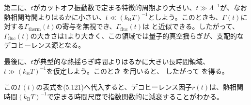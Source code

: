 第二に、$t$がカットオフ振動数で定まる特徴的周期より大きい、$t\gg\Lambda^{-1}$が、なお熱相関時間よりはるかに小さい、$t\ll(k_{\mathrm B}T)^{-1}$としよう。このときも、$\Gamma(t)$に対する$\Gamma_{\mathrm{therm}}(t)$の寄与を無視でき、$\Gamma_{\mathrm{fluc}}(t)$は
と近似できる。したがって、$\Gamma_{\mathrm{fluc}}(t)$の大きさは1より大きく、この領域では量子的真空揺らぎが、支配的なデコヒーレンス源となる。

最後に、$t$が典型的な熱揺らぎ時間よりはるかに大きい長時間領域、$t\gg(k_{\mathrm B}T)^{-1}$を仮定しよう。このとき
を用いると、
したがって
を得る。

\hypertarget{srcpage:218}{}\label{srcpage:218}
この$\Gamma(t)$の表式を(5.121)へ代入すると、デコヒーレンス因子$r(t)$は、熱相関時間$(k_{\mathrm B}T)^{-1}$で定まる時間尺度で指数関数的に減衰することがわかる。

